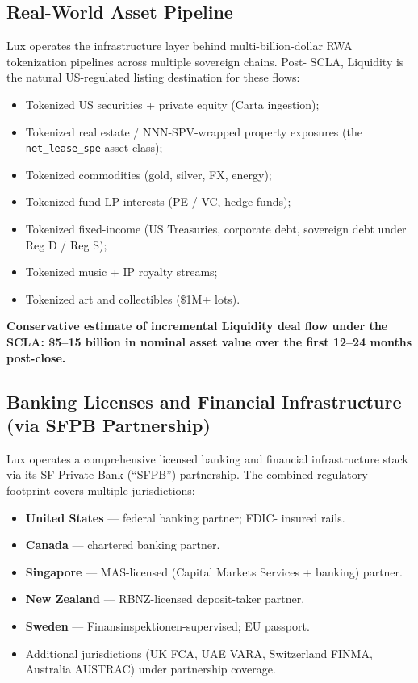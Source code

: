 \documentclass[11pt,letterpaper]{article}
\begin{document}
\subsection*{Real-World Asset Pipeline}

Lux operates the infrastructure layer behind multi-billion-dollar
RWA tokenization pipelines across multiple sovereign chains. Post-
SCLA, Liquidity is the natural US-regulated listing destination for
these flows:

\begin{itemize}[leftmargin=1.5em,itemsep=0.1em]
\item Tokenized US securities + private equity (Carta ingestion);
\item Tokenized real estate / NNN-SPV-wrapped property exposures
(the \texttt{net\_lease\_spe} asset class);
\item Tokenized commodities (gold, silver, FX, energy);
\item Tokenized fund LP interests (PE / VC, hedge funds);
\item Tokenized fixed-income (US Treasuries, corporate debt,
sovereign debt under Reg D / Reg S);
\item Tokenized music + IP royalty streams;
\item Tokenized art and collectibles (\$1M+ lots).
\end{itemize}

\textbf{Conservative estimate of incremental Liquidity deal flow
under the SCLA: \$5--15 billion in nominal asset value over the first
12--24 months post-close.}

\subsection*{Banking Licenses and Financial Infrastructure (via SFPB
Partnership)}

Lux operates a comprehensive licensed banking and financial
infrastructure stack via its SF Private Bank (``SFPB'') partnership.
The combined regulatory footprint covers multiple jurisdictions:

\begin{itemize}[leftmargin=1.5em,itemsep=0.1em]
\item \textbf{United States} --- federal banking partner; FDIC-
insured rails.
\item \textbf{Canada} --- chartered banking partner.
\item \textbf{Singapore} --- MAS-licensed (Capital Markets Services
+ banking) partner.
\item \textbf{New Zealand} --- RBNZ-licensed deposit-taker partner.
\item \textbf{Sweden} --- Finansinspektionen-supervised; EU passport.
\item Additional jurisdictions (UK FCA, UAE VARA, Switzerland FINMA,
Australia AUSTRAC) under partnership coverage.
\end{itemize}
\end{document}
